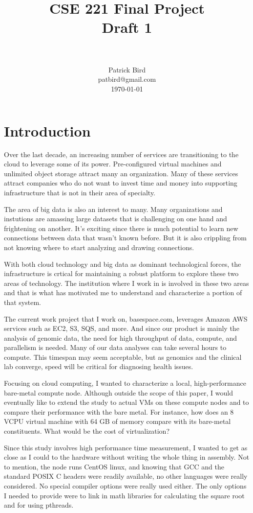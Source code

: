 \documentclass[paper=a4, fontsize=11pt]{scrartcl}
\title{
        \usefont{OT1}{bch}{b}{n}
        \normalfont \normalsize \textsc{} \\ [25pt]
        \horrule{0.5pt} \\[0.4cm]
        \huge CSE 221 Final Project \\
        \huge       Draft 1         \\
        \horrule{2pt} \\[0.5cm]
}
\author{
        \normalfont                                 \normalsize
        Patrick Bird\\[-3pt]        \normalsize
        patbird@gmail.com\\           \normalsize
        \today
}
\date{}
\numberwithin{equation}{section}        %
\numberwithin{figure}{section}          %
\numberwithin{table}{section}               %
\begin{document}
\maketitle
\section{Introduction}
Over the last decade, an increasing number of services are transitioning to the cloud to leverage some of its power.  Pre-configured virtual machines and unlimited object storage attract many an organization.  Many of these services attract companies who do not want to invest time and money into supporting infrastructure that is not in their area of specialty.

The area of big data is also an interest to many.  Many organizations and instutions are amassing large datasets that is challenging on one hand and frightening on another.  It's exciting since there is much potential to learn new connections between data that wasn't known before.  But it is also crippling from not knowing where to start analyzing and drawing connections.

With both cloud technology and big data as dominant technological forces, the infrastructure is crtical for maintaining a robust platform to explore these two areas of technology.  The institution where I work in is involved in these two areas and that is what has motivated me to understand and characterize a portion of that system.

The current work project that I work on, basespace.com, leverages Amazon AWS services such as EC2, S3, SQS, and more.  And since our product is mainly the analysis of genomic data, the need for high throughput of data, compute, and parallelism is needed.  Many of our data analyses can take several hours to compute.  This timespan may seem acceptable, but as genomics and the clinical lab converge, speed will be critical for diagnosing health issues.

Focusing on cloud computing, I wanted to characterize a local, high-performance bare-metal compute node.  Although outside the scope of this paper, I would eventually like to extend the study to actual VMs on these compute nodes and to compare their performance with the bare metal.  For instance, how does an 8 VCPU virtual machine with 64 GB of memory compare with its bare-metal constituents.  What would be the cost of virtualization?

Since this study involves high performance time measurement, I wanted to get as close as I could to the hardware without writing the whole thing in assembly.  Not to mention, the node runs CentOS linux, and knowing that GCC and the standard POSIX C headers were readily available, no other languages were really considered.  No special compiler options were really used either.  The only options I needed to provide were to link in math libraries for calculating the square root and for using pthreads.
\end{document}
